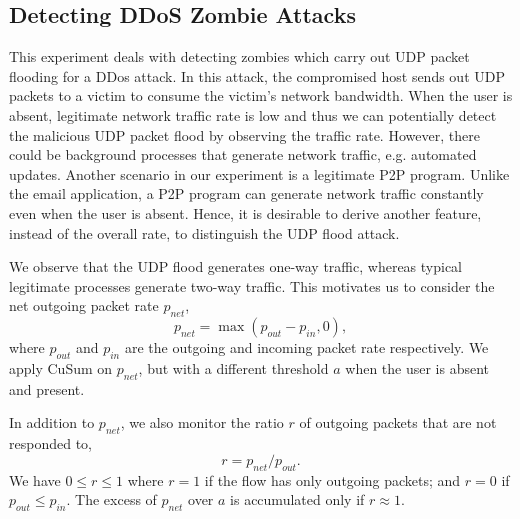 \subsection{Detecting DDoS Zombie Attacks} \label{sec:sensor-ddos}

This experiment deals with detecting zombies which carry out UDP
packet flooding for a DDos attack. In this attack, the compromised
host sends out UDP packets to a victim to consume the victim's
network bandwidth. When the user is absent, legitimate network
traffic rate is low and thus we can potentially detect the malicious
UDP packet flood by observing the traffic rate. However, there could
be background processes that generate network traffic, e.g.
automated updates. Another scenario in our experiment is a
legitimate P2P program.
Unlike the email application, a P2P program can generate network
traffic constantly even when the user is absent. Hence, it is desirable to
derive another feature, instead of the overall rate, to distinguish the
UDP flood attack.

We observe that the UDP flood generates one-way traffic, whereas typical
legitimate processes generate two-way traffic. This motivates us to
consider the net outgoing packet rate $p_{net}$,
\[p_{net} = \max(p_{out} - p_{in},0),\]
\noindent where $p_{out}$ and $p_{in}$ are the outgoing and incoming
packet rate respectively.   We apply CuSum on $p_{net}$, but with a
different threshold $a$ when the user is absent and present.

In addition to $p_{net}$, we also monitor the ratio $r$ of outgoing
packets that are not responded to, \[r=p_{net}/p_{out}.\] We have $0
\leq r \leq 1$ where $r=1$ if the flow has only outgoing packets;
and $r=0$ if $p_{out} \leq p_{in}$. The excess of $p_{net}$ over $a$
is accumulated only if $r \approx 1$.

